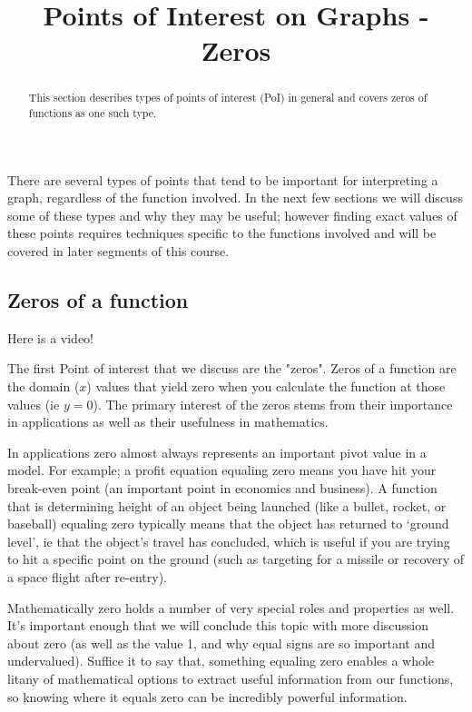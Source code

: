 \documentclass{ximera}
\title{Points of Interest on Graphs - Zeros}
\begin{document}
\begin{abstract}
    This section describes types of points of interest (PoI) in general and covers zeros of functions as one such type.
\end{abstract}
\maketitle


    There are several types of points that tend to be important for interpreting a graph, regardless of the function involved. In the next few sections we will discuss some of these types and why they may be useful; however finding exact values of these points requires techniques specific to the functions involved and will be covered in later segments of this course. 
    
\subsection*{Zeros of a function}
    
    Here is a video!
    
    
    The first Point of interest that we discuss are the "zeros". Zeros of a function are the domain ($x$) values that yield zero when you calculate the function at those values (ie $y = 0$). The primary interest of the zeros stems from their importance in applications as well as their usefulness in mathematics.
    
    In applications zero almost always represents an important pivot value in a model. For example; a profit equation equaling zero means you have hit your break-even point (an important point in economics and business). A function that is determining height of an object being launched (like a bullet, rocket, or baseball) equaling zero typically means that the object has returned to `ground level', ie that the object's travel has concluded, which is useful if you are trying to hit a specific point on the ground (such as targeting for a missile or recovery of a space flight after re-entry).
    
    Mathematically zero holds a number of very special roles and properties as well. It's important enough that we will conclude this topic with more discussion about zero (as well as the value 1, and why equal signs are so important and undervalued). Suffice it to say that, something equaling zero enables a whole litany of mathematical options to extract useful information from our functions, so knowing where it equals zero can be incredibly powerful information.
    
\end{document}
